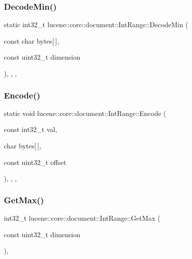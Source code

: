\subsubsection{\texorpdfstring{Decode\+Min()}{DecodeMin()}}
{\footnotesize\ttfamily static int32\+\_\+t lucene\+::core\+::document\+::\+Int\+Range\+::\+Decode\+Min (\begin{DoxyParamCaption}\item[{const char}]{bytes\mbox{[}$\,$\mbox{]},  }\item[{const uint32\+\_\+t}]{dimension }\end{DoxyParamCaption})\hspace{0.3cm}{\ttfamily [inline]}, {\ttfamily [static]}, {\ttfamily [private]}, {\ttfamily [noexcept]}}

\mbox{\label{classlucene_1_1core_1_1document_1_1IntRange_a033f58b4f7e2faa72a8ce5e875da527a}} 
\subsubsection{\texorpdfstring{Encode()}{Encode()}}
{\footnotesize\ttfamily static void lucene\+::core\+::document\+::\+Int\+Range\+::\+Encode (\begin{DoxyParamCaption}\item[{const int32\+\_\+t}]{val,  }\item[{char}]{bytes\mbox{[}$\,$\mbox{]},  }\item[{const uint32\+\_\+t}]{offset }\end{DoxyParamCaption})\hspace{0.3cm}{\ttfamily [inline]}, {\ttfamily [static]}, {\ttfamily [private]}, {\ttfamily [noexcept]}}

\mbox{\label{classlucene_1_1core_1_1document_1_1IntRange_a317cfd53b44a625e56836cf508c18257}} 
\subsubsection{\texorpdfstring{Get\+Max()}{GetMax()}}
{\footnotesize\ttfamily int32\+\_\+t lucene\+::core\+::document\+::\+Int\+Range\+::\+Get\+Max (\begin{DoxyParamCaption}\item[{const uint32\+\_\+t}]{dimension }\end{DoxyParamCaption})\hspace{0.3cm}{\ttfamily [inline]}, {\ttfamily [noexcept]}}


